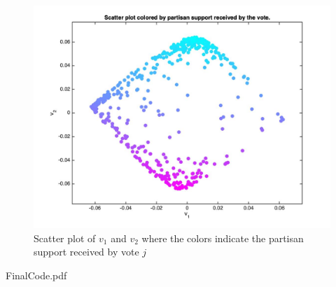 \documentclass[12pt]{exam}
\begin{document}
\begin{questions}
  \begin{figure}[hpb!]
    \centering
    \includegraphics[scale=0.3]{final_data/votes_by_partisan_support.jpg}
    \caption{Scatter plot of $v_1$ and $v_2$ where the colors indicate the partisan support received by vote $j$}
    \label{fig:scatter_plot_votes_by_partisan_support}
  \end{figure}

\end{questions}


{FinalCode.pdf}
\end{document}
